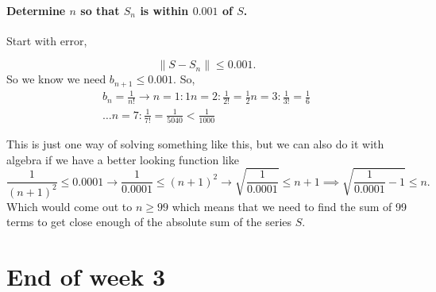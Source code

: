 \paragraph{Determine $ n $ so that $ S_n $ is within $ 0.001 $ of $ S $.\\}

Start with error, 

\[
\left\| S-S_n \right\|\le 0.001
.\] 
So we know we need $ b_{ n+1 }\le 0.001 $. So,
\begin{gather*}
b_n = \frac{ 1 }{ n! } \to n=1:1 n=2:\frac{ 1 }{ 2! } =\frac{ 1 }{ 2 } n=3:\frac{ 1 }{ 3! } =\frac{ 1 }{ 6 } \\
\ldots n=7:\frac{ 1 }{ 7! } =\frac{ 1 }{ 5040 } <\frac{ 1 }{ 1000 } 
\end{gather*}

This is just one way of solving something like this, but we can also do it with algebra if we have a better looking function like
\[
\frac{ 1 }{ \left( n+1 \right) ^2 } \le 0.0001 \to \frac{ 1 }{ 0.0001 } \le \left( n+1 \right) ^2 \to \sqrt{ \frac{ 1 }{ 0.0001 } }\le n+1 \implies \sqrt{ \frac{ 1 }{ 0.0001 } -1}\le n
.\] 
Which would come out to $ n\ge 99 $ which means that we need to find the sum of 99 terms to get close enough of the absolute sum of the series $ S $. 

\section{End of week 3}%
\label{sec:End of week 3}


